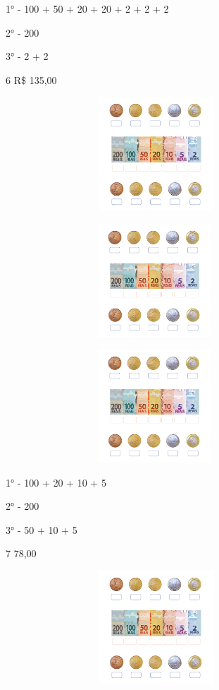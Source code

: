 1° - 100 + 50 + 20 + 20 + 2 + 2 + 2

2° - 200

3° - 2 + 2

\num{6} R\$ 135,00

\includegraphics[width=4.45833in,height=1.68116in]{media/image72.png}

\includegraphics[width=4.40625in,height=1.66152in]{media/image72.png}

\includegraphics[width=4.40625in,height=1.66152in]{media/image72.png}

1° - 100 + 20 + 10 + 5

2° - 200

3° - 50 + 10 + 5

\num{7} 78,00

\includegraphics[width=4.45833in,height=1.68116in]{media/image72.png}

